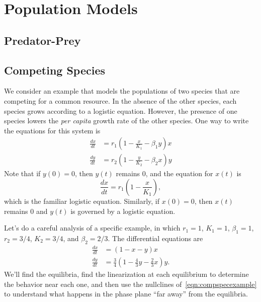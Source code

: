 \documentclass{book}
\begin{document}
\section{Population Models}
%
\subsection{Predator-Prey}
%
\subsection{Competing Species}
%
We consider an example that models the populations
of two species that are competing for a common resource.
In the absence of the other species, each species
grows according to a logistic equation.
However, the presence of one species lowers
the \emph{per capita} growth rate of the other species.
One way to write the equations for this system
is
\begin{equation}
\begin{split}
  \frac{dx}{dt} & = r_1\left(1-\frac{x}{K_1}-\beta_1 y\right)x \\
  \frac{dy}{dt} & = r_2\left(1-\frac{y}{K_2}-\beta_2 x\right)y
\end{split}
\end{equation}
Note that if $y(0)=0$, then $y(t)$ remains $0$, and
the equation for $x(t)$ is
\begin{equation}
    \frac{dx}{dt} = r_1 \left(1-\frac{x}{K_1}\right),
\end{equation}
which is the familiar logistic equation.
Similarly, if $x(0)=0$, then $x(t)$ remains $0$ and
$y(t)$ is governed by a logistic equation.

Let's do a careful analysis of a specific example,
in which $r_1 = 1$, $K_1 = 1$, $\beta_1 = 1$, 
$r_2 = 3/4$, $K_2 = 3/4$, and $\beta_2 = 2/3$.
The differential equations are
\begin{equation}
\begin{split}
  \frac{dx}{dt} & = (1-x-y)x \\
  \frac{dy}{dt} & = \frac{3}{4}\left(1 -\frac{4}{3}y - \frac{2}{3}x\right)y .
\end{split}
\label{eqn:compspecexample}
\end{equation}
We'll find the equilibria, find the linearization at each
equilibrium to determine the behavior near each one, and then
use the nullclines of~\eqref{eqn:compspecexample} to understand
what happens in the phase plane ``far away'' from the equilibria.
\end{document}
